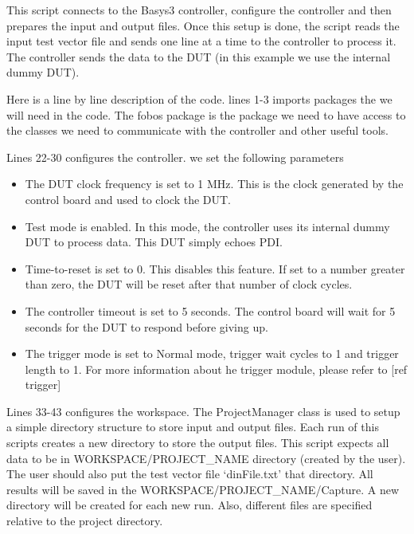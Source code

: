 \documentclass[letterpaper,10pt,english]{sphinxmanual}
\begin{document}
This script connects to the Basys3 controller, configure the controller and then prepares the input and output files.
Once this setup is done, the script reads the input test vector file and sends one line at a time to the controller to process it.
The controller sends the data to the DUT (in this example we use the internal dummy DUT).

Here is a line by line description of the code.
lines 1-3 imports packages the we will need in the code. The fobos package is the package we need to have access to the classes we need to communicate
with the controller and other useful tools.

Lines 22-30 configures the controller. we set the following parameters
\begin{itemize}
\item {} 
The DUT clock frequency is set to 1 MHz. This is the clock generated by the control board and used to clock the DUT.

\item {} 
Test mode is enabled. In this mode, the controller uses its internal dummy DUT to process data. This DUT simply echoes PDI.

\item {} 
Time-to-reset is set to 0. This disables this feature. If set to a number greater than zero, the DUT will be reset after
that number of clock cycles.

\item {} 
The controller timeout is set to 5 seconds. The control board will wait for 5 seconds for the DUT to respond before giving up.

\item {} 
The trigger mode is set to Normal mode, trigger wait cycles to 1 and trigger length to 1. For more information about he trigger module,
please refer to {[}ref trigger{]}

\end{itemize}

Lines 33-43 configures the workspace. The ProjectManager class is used to setup a simple directory structure to store input and output files.
Each run of this scripts creates a new directory to store the output files.
This script expects all data to be in WORKSPACE/PROJECT\_NAME directory (created by the user). The user should also put the test vector file
‘dinFile.txt’ that directory. All results will be saved in the WORKSPACE/PROJECT\_NAME/Capture. A new directory will be created for each new run.
Also, different files are specified relative to the project directory.
\end{document}
